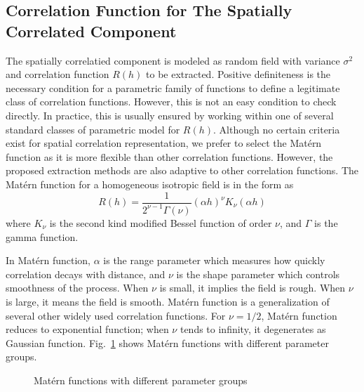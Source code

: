 \documentclass[referee]{ieice}
\begin{document}
\subsection{Correlation Function for The Spatially Correlated Component}
The spatially correlatied component is modeled as random field with variance $\sigma^2$ and
correlation function $R(h)$ to be extracted.
Positive definiteness is the necessary condition for a parametric family of functions to define
a legitimate class of correlation functions. However, this is not an easy condition to check directly.
In practice, this is usually ensured by working within one of several standard classes of parametric model
for $R(h)$.  Although no certain criteria exist for spatial correlation representation, we prefer to
select the Mat\'{e}rn function as it is more flexible than other correlation functions.
However, the proposed extraction methods are also adaptive to other correlation functions.
The Mat\'{e}rn function for a homogeneous isotropic field is in the form as
\begin{equation}
R(h)=\frac{\displaystyle 1}{\displaystyle 2^{\nu-1}\Gamma(\nu)}(\alpha h)^\nu K_\nu(\alpha h)
\end{equation}
where $K_\nu$ is the second kind modified Bessel function of order $\nu$,
and $\Gamma$ is the gamma function.

In Mat\'{e}rn function, $\alpha$ is the range parameter which measures how quickly correlation decays with distance,
and $\nu$ is the shape parameter which controls smoothness of the process.
When $\nu$ is small, it implies the field is rough. When $\nu$ is large, it means the field is smooth.
Mat\'{e}rn function is a generalization of several other widely used correlation functions. For $\nu=1/2$,
Mat\'{e}rn function reduces to exponential function; when $\nu$ tends to infinity,
it degenerates as Gaussian function.
Fig.~\ref{fig:Matern_funs} shows Mat\'{e}rn functions with different parameter groups.
\begin{figure}[tb]
  \begin{center}
    \caption{Mat\'{e}rn functions with different parameter groups } \label{fig:Matern_funs}
  \end{center}
\end{figure}
\end{document}
